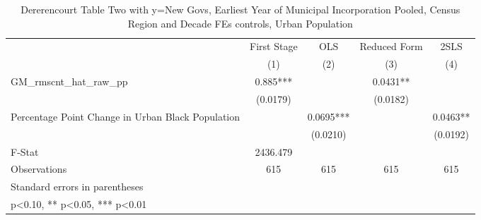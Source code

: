 \begin{table}[htbp]\centering
\def\sym#1{\ifmmode^{#1}\else\(^{#1}\)\fi}
\caption{Dererencourt Table Two with y=New Govs, Earliest Year of Municipal Incorporation  Pooled, Census Region and Decade FEs controls, Urban Population}
\begin{tabular}{l*{4}{c}}
\toprule
                    & First Stage   &         OLS   &Reduced Form   &        2SLS   \\
                    &\multicolumn{1}{c}{(1)}   &\multicolumn{1}{c}{(2)}   &\multicolumn{1}{c}{(3)}   &\multicolumn{1}{c}{(4)}   \\
\midrule
GM\_rmscnt\_hat\_raw\_pp&       0.885***&               &      0.0431** &               \\
                    &    (0.0179)   &               &    (0.0182)   &               \\
\addlinespace
Percentage Point Change in Urban Black Population&               &      0.0695***&               &      0.0463** \\
                    &               &    (0.0210)   &               &    (0.0192)   \\
\midrule
F-Stat              &    2436.479   &               &               &               \\
Observations        &         615   &         615   &         615   &         615   \\
\bottomrule
\multicolumn{5}{l}{\footnotesize Standard errors in parentheses}\\
\multicolumn{5}{l}{\footnotesize * p<0.10, ** p<0.05, *** p<0.01}\\
\end{tabular}
\end{table}
